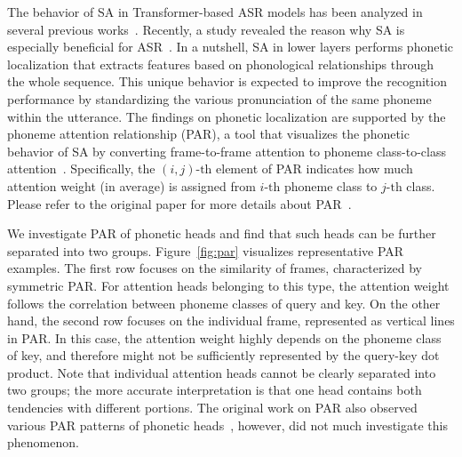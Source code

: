The behavior of SA in Transformer-based ASR models has been analyzed in several previous works~\cite{yang20i,usefulness,understanding}.
Recently, a study revealed the reason why SA is especially beneficial for ASR~\cite{understanding}.
In a nutshell, SA in lower layers performs phonetic localization that extracts features based on phonological relationships through the whole sequence.
This unique behavior is expected to improve the recognition performance by standardizing the various pronunciation of the same phoneme within the utterance.
The findings on phonetic localization are supported by the phoneme attention relationship (PAR), a tool that visualizes the phonetic behavior of SA by converting frame-to-frame attention to phoneme class-to-class attention~\cite{understanding}.
Specifically, the $(i, j)\text{-th}$ element of PAR indicates how much attention weight (in average) is assigned from $i\text{-th}$ phoneme class to $j\text{-th}$ class.
Please refer to the original paper for more details about PAR~\cite{understanding}.

We investigate PAR of phonetic heads and find that such heads can be further separated into two groups.
Figure~\ref{fig:par} visualizes representative PAR examples.
The first row focuses on the similarity of frames, characterized by symmetric PAR.
For attention heads belonging to this type, the attention weight follows the correlation between phoneme classes of query and key.
On the other hand, the second row focuses on the individual frame, represented as vertical lines in PAR.
In this case, the attention weight highly depends on the phoneme class of key, and therefore might not be sufficiently represented by the query-key dot product.
Note that individual attention heads cannot be clearly separated into two groups; the more accurate interpretation is that one head contains both tendencies with different portions.
The original work on PAR also observed various PAR patterns of phonetic heads~\cite{understanding}, however, did not much investigate this phenomenon.
